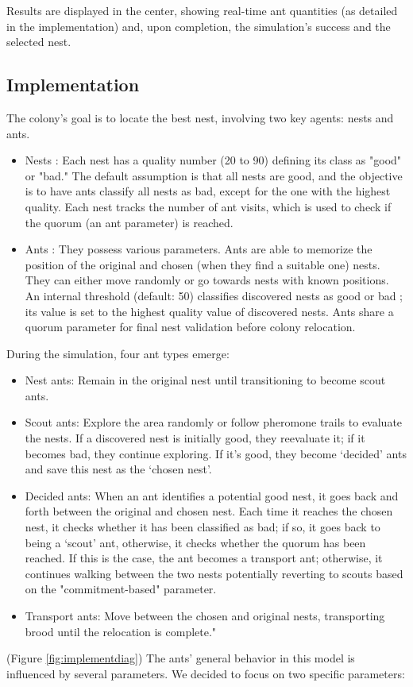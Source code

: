 \documentclass[9pt]{pnas-new}
\begin{document}
Results are displayed in the center, showing real-time ant quantities (as detailed in the implementation) and, upon completion, the simulation's success and the selected nest.



\subsection*{Implementation}



The colony's goal is to locate the best nest, involving two key agents: nests and ants.
\begin{itemize}

    \item Nests : Each nest has a quality number (20 to 90) defining its class as "good" or "bad." The default assumption is that all nests are good, and the objective is to have ants classify all nests as bad, except for the one with the highest quality.  Each nest tracks the number of ant visits, which is used to check if the quorum (an ant parameter) is reached.
    
    \item Ants : They possess various parameters. Ants are able to memorize the position of the original and chosen (when they find a suitable one) nests. They can either move randomly or go towards nests with known positions. An internal threshold (default: 50) classifies discovered nests as good or bad ; its value is set to the highest quality value of discovered nests. Ants share a quorum parameter for final nest validation before colony relocation.
\end{itemize}

During the simulation, four ant types emerge:

\begin{itemize}
    \item Nest ants: Remain in the original nest until transitioning to become scout ants.
    \item Scout ants: Explore the area randomly or follow pheromone trails to evaluate the nests. If a discovered nest is initially good, they reevaluate it; if it becomes bad, they continue exploring. If it’s good, they become ‘decided’ ants and save this nest as the ‘chosen nest’. 
    \item Decided ants: When an ant identifies a potential good nest, it goes back and forth between the original and chosen nest. Each time it reaches the chosen nest, it checks whether it has been classified as bad; if so, it goes back to being a ‘scout’ ant, otherwise, it checks whether the quorum has been reached. If this is the case, the ant becomes a transport ant; otherwise, it continues walking between the two nests potentially reverting to scouts based on the "commitment-based" parameter.
    \item Transport ants: Move between the chosen and original nests, transporting brood until the relocation is complete."
\end{itemize}
  (Figure \ref{fig:implementdiag}) The ants' general behavior in this model is influenced by several parameters. We decided to focus on two specific parameters:
\end{document}
